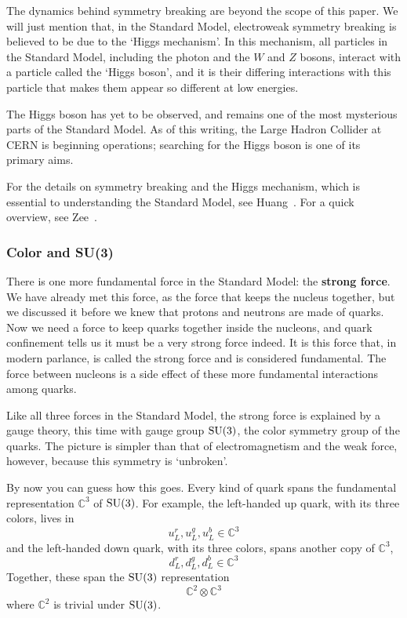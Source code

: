 \documentclass[12pt]{article}
\newcommand{\C}{{\mathbb C}}  %
\newcommand{\SU}{{\rm SU}}    %
\begin{document}
The dynamics behind symmetry breaking are beyond the scope of this paper. We
will just mention that, in the Standard Model, electroweak symmetry breaking is
believed to be due to the `Higgs mechanism'.  In this mechanism, all
particles in the Standard Model, including the photon and the $W$ and $Z$
bosons, interact with a particle called the `Higgs boson', and it is their
differing interactions with this particle that makes them appear so different
at low energies. 

The Higgs boson has yet to be observed, and remains one of the most mysterious
parts of the Standard Model. As of this writing, the Large Hadron Collider at
CERN is beginning operations; searching for the Higgs boson is one of its
primary aims.

For the details on symmetry breaking and the Higgs mechanism, which is
essential to understanding the Standard Model, see Huang~\cite{huang:qlgf}. For
a quick overview, see Zee~\cite{zee:nutshell}.

\subsubsection{Color and {\rm{SU(3)}}} \label{sec:color}

There is one more fundamental force in the Standard Model: the
\textbf{strong force}. We have already met this force, as the force that
keeps the nucleus together, but we discussed it before we knew that
protons and neutrons are made of quarks.  Now we need a force to keep
quarks together inside the nucleons, and quark confinement tells us it
must be a very strong force indeed.  It is this force that, in modern
parlance, is called the strong force and is considered fundamental. The
force between nucleons is a side effect of these more fundamental
interactions among quarks.

Like all three forces in the Standard Model, the strong force is
explained by a gauge theory, this time with gauge group $\SU(3)$, the
color symmetry group of the quarks.  The picture is simpler than that
of electromagnetism and the weak force, however, because this symmetry
is `unbroken'.  

By now you can guess how this goes. Every kind of quark spans the
fundamental representation $\C^3$ of $\SU(3)$. For example, the
left-handed up quark, with its three colors, lives in
\[ u^r_L, u^g_L, u^b_L \in \C^3 \]
and the left-handed down quark, with its three colors, spans another
copy of $\C^3$,
\[ d^r_L, d^g_L, d^b_L \in \C^3 \]
Together, these span the $\SU(3)$ representation
\[ \C^2 \otimes \C^3 \]
where $\C^2$ is trivial under $\SU(3)$.
\end{document}

